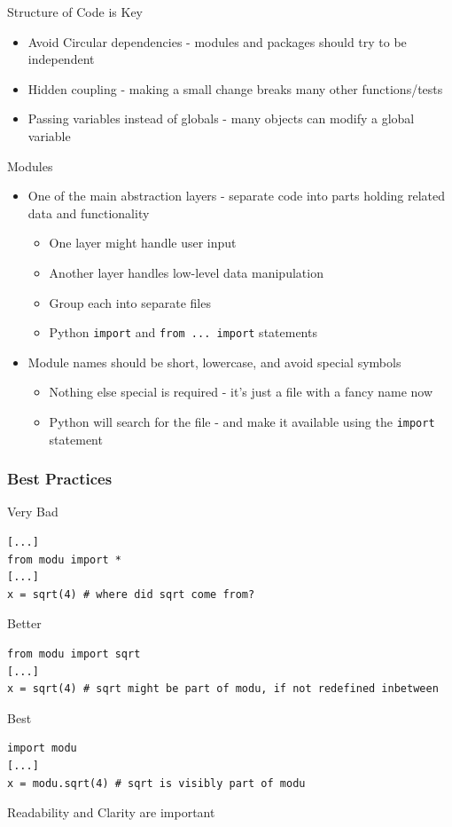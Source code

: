\documentclass[11pt,professionalfonts]{beamer}
\begin{document}
\begin{frame}{Structure of Code is Key}
    \begin{itemize}
        \item Avoid Circular dependencies - modules and packages should try to be independent
        \item Hidden coupling - making a small change breaks many other functions/tests
        \item Passing variables instead of globals - many objects can modify a global variable
    \end{itemize}
\end{frame}

\begin{frame}{Modules}
    \begin{itemize}
        \item One of the main abstraction layers - separate code into parts holding related data and functionality
            \begin{itemize}
                \item One layer might handle user input 
                \item Another layer handles low-level data manipulation
                \item Group each into separate files
                \item Python \texttt{import} and \texttt{from ... import} statements
            \end{itemize}
        \item Module names should be short, lowercase, and avoid special symbols
            \begin{itemize}
                \item Nothing else special is required - it's just a file with a fancy name now
                \item Python will search for the file - and make it available using the \texttt{import} statement
            \end{itemize}
    \end{itemize}


\end{frame}

\begin{frame}[fragile]\frametitle{Best Practices}
Very Bad
\begin{verbatim}
[...]
from modu import *
[...]
x = sqrt(4) # where did sqrt come from?
\end{verbatim}
\pause
Better
\begin{verbatim}
from modu import sqrt
[...]
x = sqrt(4) # sqrt might be part of modu, if not redefined inbetween
\end{verbatim}
\pause
Best
\begin{verbatim}
import modu
[...]
x = modu.sqrt(4) # sqrt is visibly part of modu
\end{verbatim}

\pause
\begin{alertblock}{}
    \centering
Readability and Clarity are important
\end{alertblock}
\end{frame}
\end{document}
